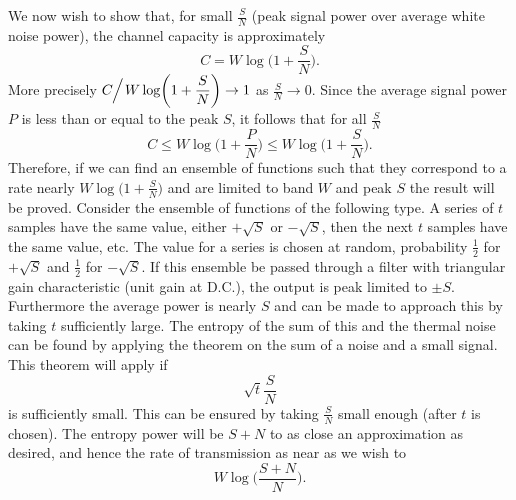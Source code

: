 We now wish to show that, for small $\displaystyle\frac S N$ (peak signal
power over average white noise power), the channel capacity is
approximately
$$
C=W\log\biggl(1+\frac S N\biggr).
$$
More precisely $\displaystyle C\!\!\Bigm/\!W\log\biggl(1+\frac S N\biggr)\to1$
as $\displaystyle\frac S N\to0$.  Since the average signal power $P$ is less
than or equal to the peak $S$, it follows that for all $\displaystyle\frac
S N$
$$
C\leq W\log\biggl(1+\frac P N\biggr)\leq W\log\biggl(1+\frac S N\biggr).
$$
Therefore, if we can find an ensemble of functions such that they
correspond to a rate nearly $\displaystyle W\log\biggl(1+\frac S N\biggr)$
and are limited to band $W$ and peak $S$ the result will be proved.
Consider the ensemble of functions of the following type.  A series of $t$
samples have the same value, either $+\sqrt{S}$ or $-\sqrt{S}$, then the
next $t$ samples have the same value, etc.  The value for a series is chosen
at random, probability $\frac12$ for $+\sqrt{S}$ and $\frac12$ for
$-\sqrt{S}$.  If this ensemble be passed through a filter with triangular
gain characteristic (unit gain at D.C.), the output is peak limited to $\pm
S$.  Furthermore the average power is nearly $S$ and can be made to
approach this by taking $t$ sufficiently large.  The entropy of the sum of
this and the thermal noise can be found by applying the theorem on the sum
of a noise and a small signal.  This theorem will apply if
$$
\sqrt{t}\frac S N
$$
is sufficiently small.  This can be ensured by
taking $\displaystyle\frac S N$ small enough (after $t$ is chosen).  The
entropy power will be $S+N$ to as close an approximation as desired, and
hence the rate of transmission as near as we wish to
$$
W\log\biggl(\frac{S+N}{N}\biggr).
$$

